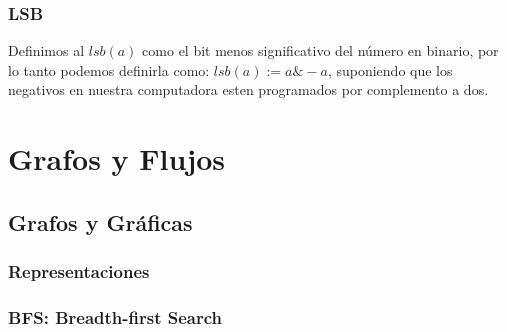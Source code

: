 \documentclass[12pt, fleqn]{report}                             %
\theoremstyle{break}                                            %
\begin{document}
        \section{LSB}

            Definimos al $lsb(a)$ como el bit menos significativo del número en binario,
            por lo tanto podemos definirla como:  $lsb(a) := a \& -a$, suponiendo que 
            los negativos en nuestra computadora esten programados por complemento a dos.
            
            

            

            


\part{Grafos y Flujos}

    \chapter{Grafos y Gráficas}    

        \section{Representaciones}

        \section{BFS: Breadth-first Search}
\end{document}
